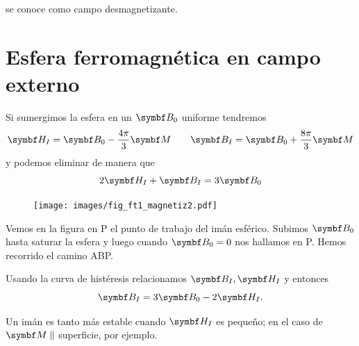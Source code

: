 \documentclass[10pt,oneside]{CBFT_book}
\begin{document}
 se conoce como campo desmagnetizante.


\section{Esfera ferromagnética en campo externo}

Si sumergimos la esfera en un $\vb{B}_0$ uniforme tendremos
\[
	\vb{H}_I = \vb{B}_0 - \frac{4\pi}{3} \vb{M} \qquad \vb{B}_I = \vb{B}_0 + \frac{8\pi}{3} \vb{M}
\]
y podemos eliminar  de manera que 
\[
	2\vb{H}_I + \vb{B}_I = 3\vb{B}_0
\]

\begin{figure}[htb]
	\begin{center}
	\texttt{[image: images/fig\_ft1\_magnetiz2.pdf]}	 
	\end{center}
	\caption{}
\end{figure} 

Vemos en la figura en P el punto de trabajo del imán esférico. Subimos $\vb{B}_0$ hasta saturar la
esfera y luego cuando $\vb{B}_0 = 0$ nos hallamos en P. Hemos recorrido el camino ABP.

Usando la curva de histéresis relacionamos $\vb{B}_I, \vb{H}_I$ y entonces
\[
	\vb{B}_I = 3 \vb{B}_0  - 2 \vb{H}_I.
\]

Un imán es tanto más estable cuando $\vb{H}_I$ es pequeño; en el caso de $\vb{M} \parallel$ superficie,
por ejemplo.

\end{document}
